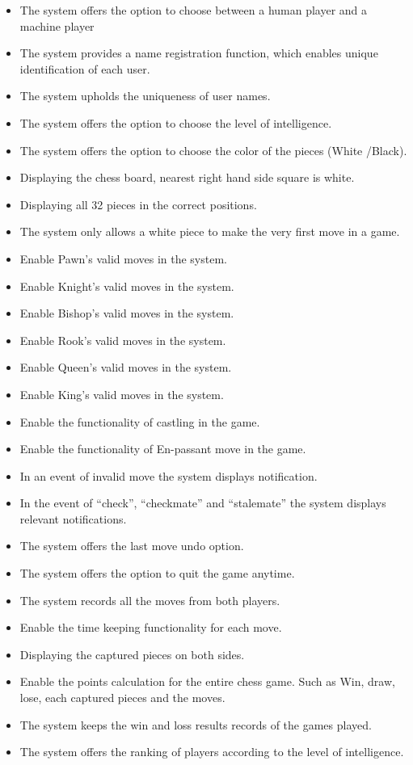 \documentclass{article}
\begin{document}
\begin{flushleft}
\begin{itemize}
	\item The system offers the option to choose between a human player and a machine player
	\item The system provides a name registration function, which enables unique identification of each user. 
	\item The system upholds the uniqueness of user names. 
	\item The system offers the option to choose the level of intelligence.
	\item The system offers the option to choose the color of the pieces (White /Black).
	\item Displaying the chess board, nearest right hand side square is white.
	\item Displaying all 32 pieces in the correct positions.
	\item The system only allows a white piece to make the very first move in a game.
	\item Enable Pawn’s valid moves in the system.
	\item Enable Knight’s valid moves in the system.
	\item Enable Bishop’s valid moves in the system.
	\item Enable Rook’s valid moves in the system.
	\item Enable Queen’s valid moves in the system.
	\item Enable King’s valid moves in the system.
	\item Enable the functionality of castling in the game.
	\item Enable the functionality of En-passant move in the game.
	\item In an event of invalid move the system displays notification.
	\item In the event of “check”, “checkmate” and “stalemate” the system displays relevant notifications.
	\item The system offers the last move undo option.
	\item The system offers the option to quit the game anytime.   
	\item The system records all the moves from both players.
	\item Enable the time keeping functionality for each move.
	\item Displaying the captured pieces on both sides.
	\item Enable the points calculation for the entire chess game. Such as Win, draw, lose, each captured pieces and the moves.	
	\item The system keeps the win and loss results records of the games played.
	\item The system offers the ranking of players according to the level of intelligence. 
\end{itemize}


\end{flushleft}
\end{document}
